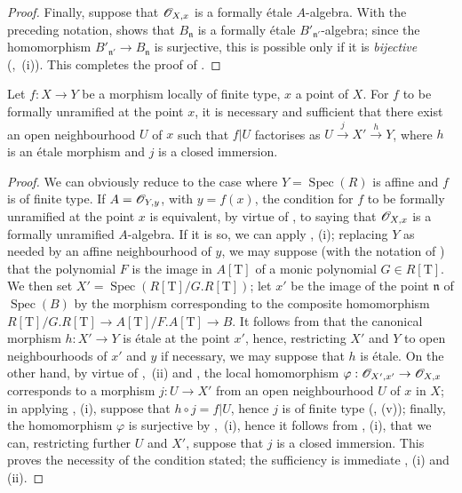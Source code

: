\begin{proof}
Finally, suppose that $\mathscr{O}_{X,x}$ is a formally \'etale $A$-algebra.
With the preceding notation,  shows that $B_\mathfrak{n}$ is a formally \'etale $B'_{\mathfrak{n}'}$-algebra; since the homomorphism $B'_{\mathfrak{n}'}\to B_\mathfrak{n}$ is surjective, this is possible only if it is \emph{bijective} (,~(i)).
This completes the proof of .
\end{proof}

\begin{corollary}[18.4.7]
\label{IV.18.4.7}
Let $f:X\to Y$ be a morphism locally of finite type, $x$ a point of $X$.
For $f$ to be formally unramified at the point $x$, it is necessary and sufficient that there exist an open neighbourhood $U$ of $x$ such that $f|U$ factorises as $U\xrightarrow{j}X'\xrightarrow{h}Y$, where $h$ is an \'etale morphism and $j$ is a closed immersion.
\end{corollary}

\begin{proof}
We can obviously reduce to the case where $Y=\operatorname{Spec}(R)$ is affine and $f$ is of finite type.
If $A=\mathscr{O}_{Y,y}$, with $y=f(x)$, the condition for $f$ to be formally unramified at the point $x$ is equivalent, by virtue of , to saying that $\mathscr{O}_{X,x}$ is a formally unramified $A$-algebra.
If it is so, we can apply , (i);
replacing $Y$ as needed by an affine neighbourhood of $y$, we may suppose (with the notation of ) that the polynomial $F$ is the image in $A[\mathrm{T}]$ of a monic polynomial $G\in R[\mathrm{T}]$.
We then set $X'=\operatorname{Spec}(R[\mathrm{T}]/G.R[\mathrm{T}])$;
let $x'$ be the image of the point $\mathfrak{n}$ of $\operatorname{Spec}(B)$ by the morphism corresponding to the composite homomorphism $R[\mathrm{T}]/G.R[\mathrm{T}]\to A[\mathrm{T}]/F.A[\mathrm{T}]\to B$.
It follows from  that the canonical morphism $h:X'\to Y$ is \'etale at the point $x'$, hence, restricting $X'$ and $Y$ to open neighbourhoods of $x'$ and $y$ if necessary, we may suppose that $h$ is \'etale.
On the other hand, by virtue of ,~(ii) and , the local homomorphism $\varphi:\mathscr{O}_{X',x'}\to\mathscr{O}_{X,x}$ corresponds to a morphism
$j:U\to X'$ from an open neighbourhood $U$ of $x$ in $X$;
in applying , (i), suppose that $h\circ j=f|U$, hence $j$ is of finite type (, (v));
finally, the homomorphism $\varphi$ is surjective by ,~(i), hence it follows from , (i), that we can, restricting further $U$ and $X'$, suppose that $j$ is a closed immersion.
This proves the necessity of the condition stated;
the sufficiency is immediate , (i) and (ii).
\end{proof}

